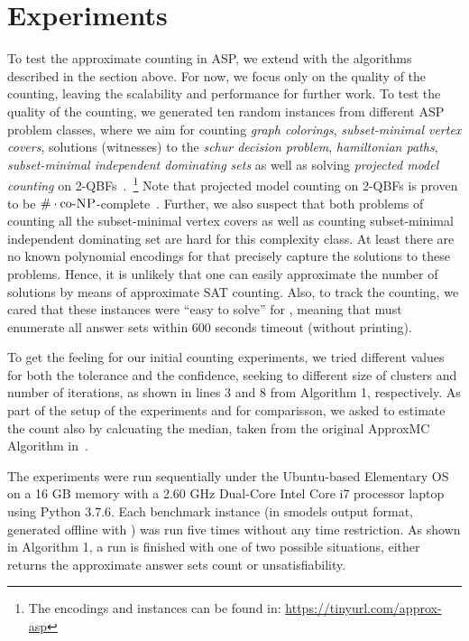 \section{Experiments} \label{sec:experiments}

To test the approximate counting in ASP, we extend \xorro{} with the algorithms described in the section above.
For now, we focus only on the quality of the counting, leaving the scalability and performance for further work.
%
To test the quality of the counting,
we generated ten random instances from different ASP problem classes, where we aim for counting \emph{graph colorings}, \emph{subset-minimal vertex covers}, solutions (witnesses) to the \emph{schur decision problem}, \emph{hamiltonian paths}, \emph{subset-minimal independent dominating sets} as well as solving \emph{projected model counting} on 2-QBFs~\cite{DurandHermannKolaitis05,KleineBuningLettman99}.~\footnote{The encodings and instances can be found in: \url{https://tinyurl.com/approx-asp}}
Note that projected model counting on 2-QBFs is proven to be $\#\cdot\text{co-}\textsc{NP}$-complete~\cite{DurandHermannKolaitis05}. Further, we also suspect that both problems of counting all the subset-minimal vertex covers as well as counting subset-minimal independent dominating set are hard for this complexity class. At least there are no known polynomial encodings for \SAT that precisely capture the solutions to these problems. Hence, it is unlikely that one can easily approximate the number of solutions by means of approximate SAT counting.
Also, to track the counting, we cared that these instances were ``easy to solve'' for \clasp{},
meaning that \clasp{} must enumerate all answer sets within 600 seconds timeout (without printing).

To get the feeling for our initial counting experiments, we tried different values for both the tolerance and the confidence, seeking to different size of clusters and number of iterations,
as shown in lines 3 and 8 from Algorithm 1, respectively.
As part of the setup of the experiments and for comparisson, we asked \xorro{} to estimate the count also by calcuating the median, taken from the original ApproxMC Algorithm in~\cite{ChakrabortyMV13}.

The experiments were run sequentially under the Ubuntu-based Elementary OS on a 16 GB memory with a 2.60 GHz Dual-Core Intel Core i7 processor laptop using Python 3.7.6.
Each benchmark instance (in smodels output format, generated offline with \gringo{}) was run five times without any time restriction. 
As shown in Algorithm 1, a run is finished with one of two possible situations, either \xorro{} returns the approximate answer sets count or unsatisfiability.

